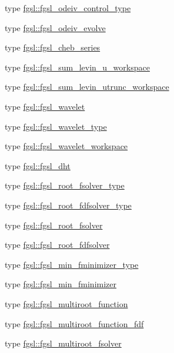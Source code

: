 \begin{DoxyCompactItemize}
\item 
type \hyperlink{structfgsl_1_1fgsl__odeiv__control__type}{fgsl\-::fgsl\-\_\-odeiv\-\_\-control\-\_\-type}
\item 
type \hyperlink{structfgsl_1_1fgsl__odeiv__evolve}{fgsl\-::fgsl\-\_\-odeiv\-\_\-evolve}
\item 
type \hyperlink{structfgsl_1_1fgsl__cheb__series}{fgsl\-::fgsl\-\_\-cheb\-\_\-series}
\item 
type \hyperlink{structfgsl_1_1fgsl__sum__levin__u__workspace}{fgsl\-::fgsl\-\_\-sum\-\_\-levin\-\_\-u\-\_\-workspace}
\item 
type \hyperlink{structfgsl_1_1fgsl__sum__levin__utrunc__workspace}{fgsl\-::fgsl\-\_\-sum\-\_\-levin\-\_\-utrunc\-\_\-workspace}
\item 
type \hyperlink{structfgsl_1_1fgsl__wavelet}{fgsl\-::fgsl\-\_\-wavelet}
\item 
type \hyperlink{structfgsl_1_1fgsl__wavelet__type}{fgsl\-::fgsl\-\_\-wavelet\-\_\-type}
\item 
type \hyperlink{structfgsl_1_1fgsl__wavelet__workspace}{fgsl\-::fgsl\-\_\-wavelet\-\_\-workspace}
\item 
type \hyperlink{structfgsl_1_1fgsl__dht}{fgsl\-::fgsl\-\_\-dht}
\item 
type \hyperlink{structfgsl_1_1fgsl__root__fsolver__type}{fgsl\-::fgsl\-\_\-root\-\_\-fsolver\-\_\-type}
\item 
type \hyperlink{structfgsl_1_1fgsl__root__fdfsolver__type}{fgsl\-::fgsl\-\_\-root\-\_\-fdfsolver\-\_\-type}
\item 
type \hyperlink{structfgsl_1_1fgsl__root__fsolver}{fgsl\-::fgsl\-\_\-root\-\_\-fsolver}
\item 
type \hyperlink{structfgsl_1_1fgsl__root__fdfsolver}{fgsl\-::fgsl\-\_\-root\-\_\-fdfsolver}
\item 
type \hyperlink{structfgsl_1_1fgsl__min__fminimizer__type}{fgsl\-::fgsl\-\_\-min\-\_\-fminimizer\-\_\-type}
\item 
type \hyperlink{structfgsl_1_1fgsl__min__fminimizer}{fgsl\-::fgsl\-\_\-min\-\_\-fminimizer}
\item 
type \hyperlink{structfgsl_1_1fgsl__multiroot__function}{fgsl\-::fgsl\-\_\-multiroot\-\_\-function}
\item 
type \hyperlink{structfgsl_1_1fgsl__multiroot__function__fdf}{fgsl\-::fgsl\-\_\-multiroot\-\_\-function\-\_\-fdf}
\item 
type \hyperlink{structfgsl_1_1fgsl__multiroot__fsolver}{fgsl\-::fgsl\-\_\-multiroot\-\_\-fsolver}
\item 

\end{DoxyCompactItemize}
